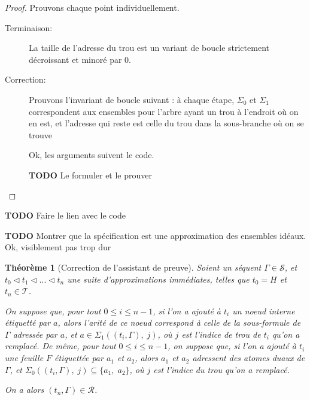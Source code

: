 \documentclass[11pt,a4paper]{article}
\theoremstyle{plain}
\newtheorem{theorem}{Théorème}
\theoremstyle{definition}
\theoremstyle{remark}
\newcommand*{\sequent}{\Gamma}
\newcommand*{\sequents}{\ensuremath{\mathcal{S}}}
\newcommand*{\trees}{\ensuremath{\mathcal{T}}}
\newcommand*{\representations}{\ensuremath{\mathcal{R}}}
\newcommand*{\relapprox}{\ensuremath{\triangleleft}}
\newcommand*{\unknown}{H}
\newcommand*{\lowapprox}{\ensuremath{\Sigma_0}}
\newcommand*{\highapprox}{\ensuremath{\Sigma_1}}
\newcommand*{\todo}{{\normalfont \textbf{TODO}} }
\begin{document}
\begin{proof}
    Prouvons chaque point individuellement.
    \begin{description}
        \item[Terminaison:] La taille de l'adresse du trou est un variant de boucle strictement décroissant et minoré par 0.

        \item[Correction:] Prouvons l'invariant de boucle suivant : \og à chaque étape, $\lowapprox$ et $\highapprox$ correspondent aux ensembles pour l'arbre ayant un trou à l'endroit où on en est, et l'adresse qui reste est celle du trou dans la sous-branche où on se trouve \fg

        Ok, les arguments suivent le code.

        \todo{Le formuler et le prouver}
    \end{description}
\end{proof}

\todo{Faire le lien avec le code}

\todo{Montrer que la spécification est une approximation des ensembles idéaux. Ok, visiblement pas trop dur}

\begin{theorem}[Correction de l'assistant de preuve]
    Soient un séquent $\sequent \in \sequents$, et $t_0 \relapprox t_1 \relapprox ... \relapprox t_n$ une suite d'approximations immédiates, telles que $t_0 = \unknown$ et $t_n \in \trees$.
    
    On suppose que, pour tout $0 \leq i \leq n-1$, si l'on a ajouté à $t_i$ un noeud interne étiquetté par $a$, alors l'arité de ce noeud correspond à celle de la sous-formule de $\sequent$ adressée par $a$, et $a \in \highapprox((t_i, \sequent), \; j)$, où $j$ est l'indice de trou de $t_i$ qu'on a remplacé. De même, pour tout $0 \leq i \leq n-1$, on suppose que, si l'on a ajouté à $t_i$ une feuille $F$ étiquettée par $a_1$ et $a_2$, alors $a_1$ et $a_2$ adressent des atomes duaux de $\sequent$, et $\lowapprox((t_i, \sequent), \; j) \subseteq \{a_1, \; a_2\}$, où $j$ est l'indice du trou qu'on a remplacé.

    On a alors $(t_n, \sequent) \in \representations$.
\end{theorem}
\end{document}
